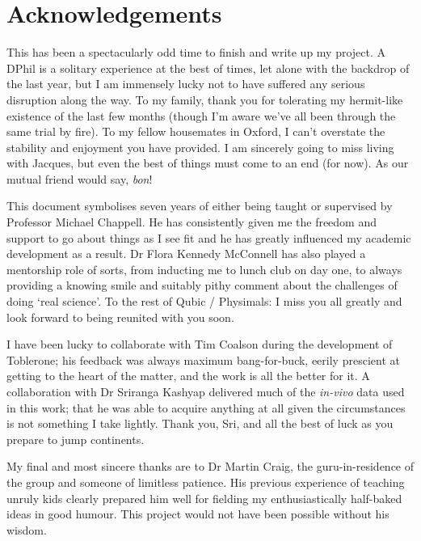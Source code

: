  

\chapter*{Acknowledgements}

This has been a spectacularly odd time to finish and write up my project. A DPhil is a solitary experience at the best of times, let alone with the backdrop of the last year, but I am immensely lucky not to have suffered any serious disruption along the way. To my family, thank you for tolerating my hermit-like existence of the last few months (though I'm aware we've all been through the same trial by fire). To my fellow housemates in Oxford, I can't overstate the stability and enjoyment you have provided. I am sincerely going to miss living with Jacques, but even the best of things must come to an end (for now). As our mutual friend would say, \textit{bon}! 

This document symbolises seven years of either being taught or supervised by Professor Michael Chappell. He has consistently given me the freedom and support to go about things as I see fit and he has greatly influenced my academic development as a result. Dr Flora Kennedy McConnell has also played a mentorship role of sorts, from inducting me to lunch club on day one, to always providing a knowing smile and suitably pithy comment about the challenges of doing `real science'. To the rest of Qubic / Physimals: I miss you all greatly and look forward to being reunited with you soon. 

I have been lucky to collaborate with Tim Coalson during the development of Toblerone; his feedback was always maximum bang-for-buck, eerily prescient at getting to the heart of the matter, and the work is all the better for it. A collaboration with Dr Sriranga Kashyap delivered much of the \textit{in-vivo} data used in this work; that he was able to acquire anything at all given the circumstances is not something I take lightly. Thank you, Sri, and all the best of luck as you prepare to jump continents. 

My final and most sincere thanks are to Dr Martin Craig, the guru-in-residence of the group and someone of limitless patience. His previous experience of teaching unruly kids clearly prepared him well for fielding my enthusiastically half-baked ideas in good humour. This project would not have been possible without his wisdom. 

